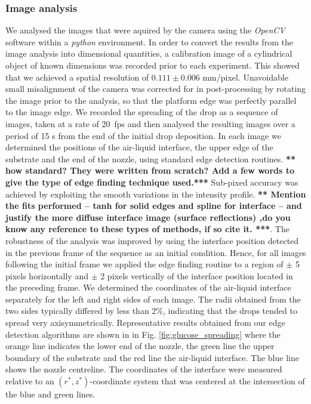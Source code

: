 \documentclass[aip,graphicx]{revtex4-1}
\begin{document}
\subsubsection{Image analysis\label{image}}
We analysed the images that were aquired by the camera using the \textit{OpenCV}
software\cite{bradski2008learning} within a \textit{python} environment.  In
order to convert the results from the image analysis into dimensional
quantities, a calibration image of a cylindrical object of known
dimensions was recorded prior to each experiment. This showed
that we achieved a spatial resolution of $0.111 \pm 0.006$
mm/pixel. Unavoidable small misalignment of the camera was corrected for in
post-processing by rotating the image prior to the analysis, so that
the platform edge was perfectly parallel to the image edge.
We recorded the spreading of the drop as a sequence of images, taken at a
rate of 20~fps and then analysed the resulting images over a period of 
15 s from the end of the initial drop deposition. In each image we determined 
the positions of the air-liquid interface, the upper edge of the
substrate and the end of the nozzle, using standard edge detection routines. {\bf *** how standard? They were written from scratch? Add a few words to give the type of edge finding technique used.***}
Sub-pixed accuracy was achieved by exploiting the smooth variations 
in the intensity profile.  {\bf  *** Mention the fits performed -- tanh for solid edges and spline for interface -- and justify the more diffuse interface image (surface reflections) ,do you know any reference to these types of methods, if so cite it. ***}. The robustness of
the analysis was improved by using the interface position detected in the
previous frame of the sequence as an initial condition. Hence, for all
images following the initial frame we applied the edge finding routine
to a region of $\pm$ 5 pixels horizontally and $\pm$ 2 pixels
vertically of the interface position located in the preceding
frame. We determined the coordinates of the air-liquid interface separately
for the left and right sides of each image. The radii obtained from
the two sides typically differed by less than 2\%, indicating that
the drops tended to spread very axisymmetrically. Representative
results obtained from our edge detection algorithms are shown in in Fig. 
\ref{fig:glucose_spreading} where the orange line indicates the lower
end of the nozzle, the green line the upper boundary of the 
substrate and the red line the air-liquid interface. The blue line
shows the nozzle centreline. The coordinates of the interface were 
measured relative to an $(r^*,z^*)$-coordinate system that was centered at
the intersection of the blue and green lines.
\end{document}
